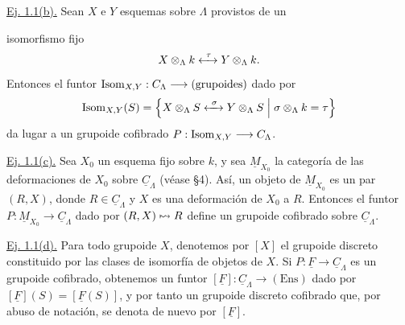 \underline{Ej. 1.1(b).} Sean $X$ e $Y$ esquemas sobre $\Lambda$
provistos de un


isomorfismo fijo
\[
 X\otimes_\Lambda k\xleftrightarrow{\ \tau\ }Y\otimes_\Lambda k.
\]
Entonces el funtor
$\operatorname{Isom}_{X,Y}:C_\Lambda\longrightarrow(\text{grupoides})$
dado por
\[
 \operatorname{Isom}_{X,Y}(S)=
 \left\{X\otimes_\Lambda S\xleftrightarrow{\ \sigma\ }
 Y\otimes_\Lambda S\;\middle|\;
 \sigma\otimes_\Lambda k=\tau\right\}
\]
da lugar a un grupoide cofibrado
$P:\operatorname{Isom}_{X,Y}\longrightarrow C_\Lambda$.

\underline{Ej. 1.1(c).} Sea $X_0$ un esquema fijo sobre $k$, y sea
$\underline M_{X_0}$ la categoría de las deformaciones de $X_0$ sobre
$\underline C_\Lambda$ (véase \S4). Así, un objeto de
$\underline M_{X_0}$ es un par $(R,X)$, donde
$R\in\underline C_\Lambda$ y $X$ es una deformación de $X_0$ a $R$.
Entonces el funtor
$P:\underline M_{X_0}\longrightarrow\underline C_\Lambda$ dado por
$(R,X)\mathrel{\mapstochar\rightsquigarrow} R$ define un grupoide cofibrado sobre
$\underline C_\Lambda$.

\underline{Ej. 1.1(d).} Para todo grupoide $X$, denotemos por $[X]$ el
grupoide discreto constituido por las clases de isomorfía de objetos de
$X$. Si $P:\underline F\longrightarrow\underline C_\Lambda$ es un
grupoide cofibrado, obtenemos un funtor
$[\underline F]:\underline C_\Lambda\longrightarrow(\mathrm{Ens})$
dado por $[\underline F](S)=[\underline F(S)]$, y por tanto un grupoide
discreto cofibrado que, por abuso de notación, se denota de nuevo por
$[\underline F]$.
